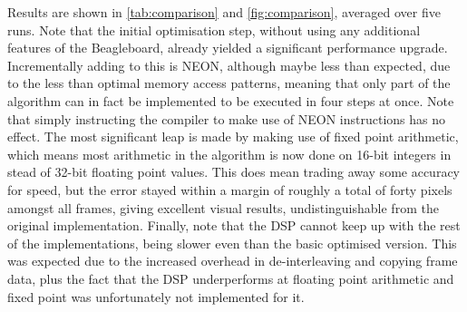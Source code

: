 \documentclass[final]{article}
\begin{document}
Results are shown in \cref{tab:comparison} and \cref{fig:comparison}, averaged over five runs. Note that the initial optimisation step, without using any additional features of the Beagleboard, already yielded a significant performance upgrade.
Incrementally adding to this is NEON, although maybe less than expected, due to the less than optimal memory access patterns, meaning that only part of the algorithm can in fact be implemented to be executed in four steps at once.
Note that simply instructing the compiler to make use of NEON instructions has no effect.
The most significant leap is made by making use of fixed point arithmetic, which means most arithmetic in the algorithm is now done on 16-bit integers in stead of 32-bit floating point values.
This does mean trading away some accuracy for speed, but the error stayed within a margin of roughly a total of forty pixels amongst all frames, giving excellent visual results, undistinguishable from the original implementation.
Finally, note that the DSP cannot keep up with the rest of the implementations, being slower even than the basic optimised version. This was expected due to the increased overhead in de-interleaving and copying frame data, plus the fact that the DSP underperforms at floating point arithmetic and fixed point was unfortunately not implemented for it.
\end{document}
